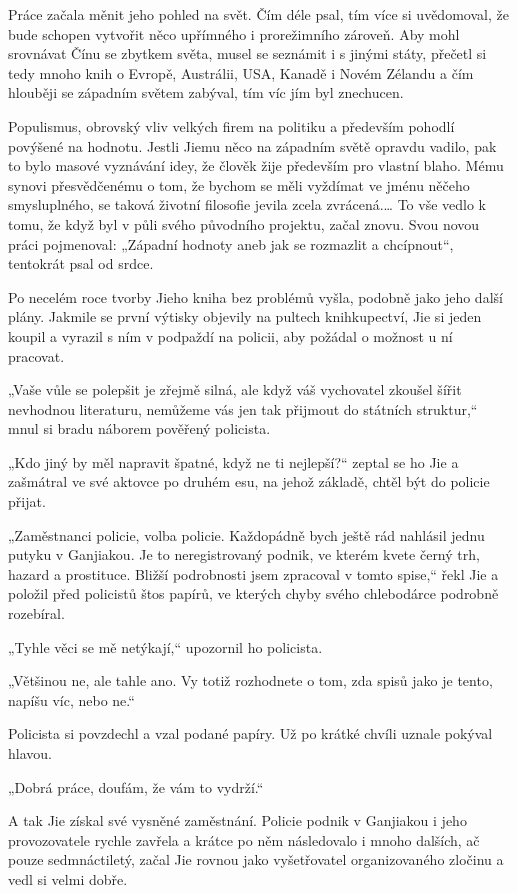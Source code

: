 Práce začala měnit jeho pohled na svět. Čím déle psal, tím více si uvědomoval, že bude schopen vytvořit něco upřímného i prorežimního zároveň. Aby mohl srovnávat Čínu se zbytkem světa, musel se seznámit i s jinými státy, přečetl si tedy mnoho knih o Evropě, Austrálii, USA, Kanadě i Novém Zélandu a čím hlouběji se západním světem zabýval, tím víc jím byl znechucen.

Populismus, obrovský vliv velkých firem na politiku a především pohodlí povýšené na hodnotu. Jestli Jiemu něco na západním světě opravdu vadilo, pak to bylo masové vyznávání idey, že člověk žije především pro vlastní blaho. Mému synovi přesvědčenému o tom, že bychom se měli vyždímat ve jménu něčeho smysluplného, se taková životní filosofie jevila zcela zvrácená.… To vše vedlo k tomu, že když byl v půli svého původního projektu, začal znovu.  Svou novou práci pojmenoval: „Západní hodnoty aneb jak se rozmazlit a chcípnout“, tentokrát psal od srdce. 

Po necelém roce tvorby Jieho kniha bez problémů vyšla, podobně jako jeho další plány. 
Jakmile se první výtisky objevily na pultech knihkupectví, Jie si jeden koupil a vyrazil s ním v podpaždí na policii, aby požádal o možnost u ní pracovat.

„Vaše vůle se polepšit je zřejmě silná, ale když váš vychovatel zkoušel šířit nevhodnou literaturu, nemůžeme vás jen tak přijmout do státních struktur,“ mnul si bradu náborem pověřený policista.

„Kdo jiný by měl napravit špatné, když ne ti nejlepší?“ zeptal se ho Jie a zašmátral ve své aktovce po druhém esu, na jehož základě, chtěl být do policie přijat.

„Zaměstnanci policie, volba policie. Každopádně bych ještě rád nahlásil jednu putyku v Ganjiakou. Je to neregistrovaný podnik, ve kterém kvete černý trh, hazard a prostituce. Bližší podrobnosti jsem zpracoval v tomto spise,“ řekl Jie a položil před policistů štos papírů, ve kterých chyby svého chlebodárce podrobně rozebíral.

„Tyhle věci se mě netýkají,“ upozornil ho policista.

„Většinou ne, ale tahle ano. Vy totiž rozhodnete o tom, zda spisů jako je tento, napíšu víc, nebo ne.“

Policista si povzdechl a vzal podané papíry. Už po krátké chvíli uznale pokýval hlavou.

„Dobrá práce, doufám, že vám to vydrží.“ 

A tak Jie získal své vysněné zaměstnání. Policie podnik v Ganjiakou i jeho provozovatele rychle zavřela a krátce po něm následovalo i mnoho dalších, ač pouze sedmnáctiletý, začal Jie rovnou jako vyšetřovatel organizovaného zločinu a vedl si velmi dobře. 

